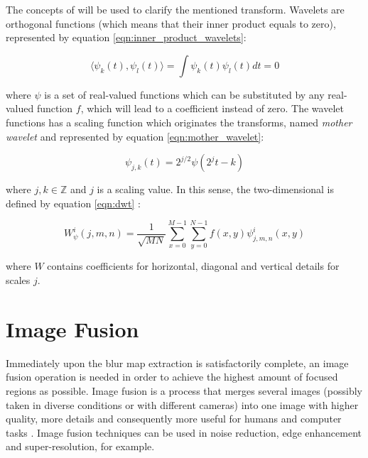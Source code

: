 The concepts of  will be used to clarify the mentioned transform. Wavelets are orthogonal functions (which means that their inner product equals to zero), represented by equation \ref{eqn:inner_product_wavelets}:

\begin{equation}
\label{eqn:inner_product_wavelets}    
    \langle \psi_{k}(t), \psi_{l}(t) \rangle = \int\psi_{k}(t)\psi_{l}(t)dt = 0
\end{equation}

\noindent where $\psi$ is a set of real-valued functions which can be substituted by any real-valued function $f$, which will lead to a coefficient instead of zero. The wavelet functions has a scaling function which originates the transforms, named \emph{mother wavelet} and represented by equation \ref{eqn:mother_wavelet}:

\begin{equation}
\label{eqn:mother_wavelet}    
    \psi_{j,k}(t) = 2^{j/2}\psi(2^{j}t - k)
\end{equation}

\noindent where $j,k \in \mathbb{Z}$ and $j$ is a scaling value. In this sense, the two-dimensional  is defined by equation \ref{eqn:dwt} \cite{gonzalez2008digital}:

\begin{equation}
\label{eqn:dwt}    
    W_{\psi}^{i}(j,m,n) = \frac{1}{\sqrt{MN}}\sum_{x=0}^{M-1}\sum_{y=0}^{N-1}f(x,y)\psi_{j,m,n}^{i}(x,y)
\end{equation}

\noindent where $W$ contains coefficients for horizontal, diagonal and vertical details for scales $j$. 

\section{Image Fusion}

Immediately upon the blur map extraction is satisfactorily complete, an image fusion operation is needed in order to achieve the highest amount of focused regions as possible. Image fusion is a process that merges several images (possibly taken in diverse conditions or with different cameras) into one image with higher quality, more details and consequently more useful for humans and computer tasks \cite{mitchell2010image}. Image fusion techniques can be used in noise reduction, edge enhancement and super-resolution, for example. 


